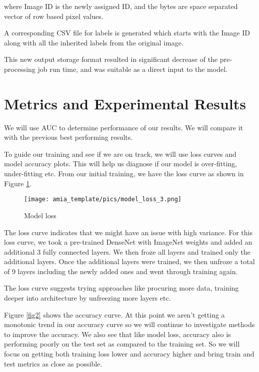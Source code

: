 \documentclass{amia}
\begin{document}

where Image ID is the newly assigned ID, and the bytes are space separated vector of row based pixel values.

A corresponding CSV file for labels is generated which starts with the Image ID along with all the inherited labels from the original image.

This new output storage format resulted in significant decrease of the pre-processing job run time, and was suitable as a direct input to the model.



\section*{Metrics and Experimental Results}
We will use AUC to determine performance of our results. We will compare it with the previous best performing results.

To guide our training and see if we are on track, we will use loss curves and model accuracy plots. This will help us diagnose if our model is over-fitting, under-fitting etc. From our initial training, we have the loss curve as shown in Figure \ref{fig1}.

\begin{figure}[h!]
\centering
\texttt{[image: amia\_template/pics/model\_loss\_3.png]}
\caption{Model loss}
\label{fig1}
\end{figure}

The loss curve indicates that we might have an issue with high variance. For this loss curve, we took a pre-trained DenseNet with ImageNet weights and added an additional 3 fully connected layers. We then froze all layers and trained only the additional layers. Once the additional layers were trained, we then unfroze a total of 9 layers including the newly added ones and went through training again.

The loss curve suggests trying approaches like procuring more data, training deeper into architecture by unfreezing more layers etc.

Figure \ref{fig2} shows the accuracy curve. At this point we aren't getting a monotonic trend in our accuracy curve so we will continue to investigate methods to improve the accuracy. We also see that like model loss, accuracy also is performing poorly on the test set as compared to the training set. So we will focus on getting both training loss lower and accuracy higher and bring train and test metrics as close as possible.
\end{document}
